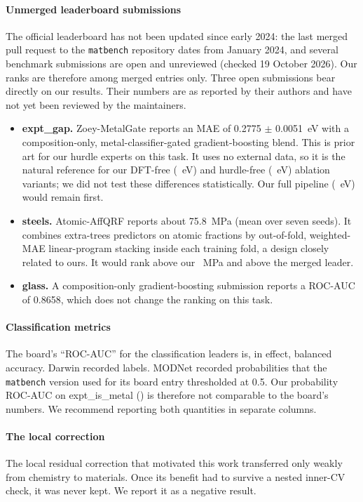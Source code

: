 \paragraph{Unmerged leaderboard submissions}
The official leaderboard has not been updated since early 2024: the last merged pull request to the \texttt{matbench} repository dates from January 2024, and several benchmark submissions are open and unreviewed (checked 19 October 2026). Our ranks are therefore among merged entries only. Three open submissions bear directly on our results. Their numbers are as reported by their authors and have not yet been reviewed by the maintainers.
\begin{itemize}
\item \textbf{expt\_gap.} Zoey-MetalGate \citep{mbpr364} reports an MAE of 0.2775 $\pm$ 0.0051~eV with a composition-only, metal-classifier-gated gradient-boosting blend. This is prior art for our hurdle experts on this task. It uses no external data, so it is the natural reference for our DFT-free (\AblNoDftGap~eV) and hurdle-free (\AblNoHurdleGap~eV) ablation variants; we did not test these differences statistically. Our full pipeline (\AtwoFinalGap~eV) would remain first.
\item \textbf{steels.} Atomic-AffQRF \citep{mbpr371} reports about 75.8~MPa (mean over seven seeds). It combines extra-trees predictors on atomic fractions by out-of-fold, weighted-MAE linear-program stacking inside each training fold, a design closely related to ours. It would rank above our \AtwoFinalSteels~MPa and above the merged leader.
\item \textbf{glass.} A composition-only gradient-boosting submission \citep{mbpr363} reports a ROC-AUC of 0.8658, which does not change the ranking on this task.
\end{itemize}

\paragraph{Classification metrics}
The board's ``ROC-AUC'' for the classification leaders is, in effect, balanced accuracy. Darwin recorded labels. MODNet recorded probabilities that the \texttt{matbench} version used for its board entry thresholded at 0.5.
Our probability ROC-AUC on expt\_is\_metal (\AtwoAUCMetal) is therefore not comparable to the board's numbers.
We recommend reporting both quantities in separate columns.

\paragraph{The local correction}
The local residual correction that motivated this work transferred only weakly from chemistry to materials. Once its benefit had to survive a nested inner-CV check, it was never kept. We report it as a negative result.

